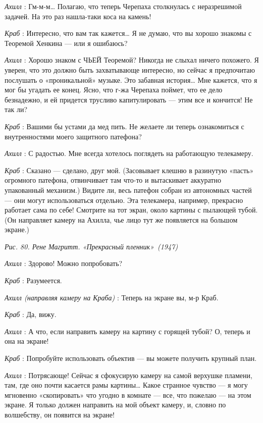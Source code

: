 \documentclass[../main.tex]{subfiles}
\begin{document}
\begin{dialogue}
\emph{Ахилл} : Гм-м-м\ldots{} Полагаю, что теперь Черепаха столкнулась с неразрешимой задачей. На это раз нашла-таки коса на камень!

\emph{Краб} : Интересно, что вам так кажется\ldots{} Я не думаю, что вы хорошо знакомы с Теоремой Хенкина --- или я ошибаюсь?

\emph{Ахилл} : Хорошо знаком с ЧЬЕЙ Теоремой? Никогда не слыхал ничего похожего. Я уверен, что это должно быть захватывающе интересно, но сейчас я предпочитаю послушать о «проникальной» музыке. Это забавная история\ldots{} Мне кажется, что я мог бы угадать ее конец. Ясно, что г-жа Черепаха поймет, что ее дело безнадежно, и ей придется трусливо капитулировать --- этим все и кончится! Не так ли?

\emph{Краб} : Вашими бы устами да мед пить. Не желаете ли теперь ознакомиться с внутренностями моего защитного патефона?

\emph{Ахилл} : С радостью. Мне всегда хотелось поглядеть на работающую телекамеру.

\emph{Краб} : Сказано --- сделано, друг мой. (Засовывает клешню в разинутую «пасть» огромного патефона, отвинчивает там что-то и вытаскивает аккуратно упакованный механизм.) Видите ли, весь патефон собран из автономных частей --- они могут использоваться отдельно. Эта телекамера, например, прекрасно работает сама по себе! Смотрите на тот экран, около картины с пылающей тубой. (Он направляет камеру на Ахилла, чье лицо тут же появляется на большом экране.)

\emph{Рис. 80. Рене Магритт. «Прекрасный пленник»~(1947)}

\emph{Ахилл} : Здорово! Можно попробовать?

\emph{Краб} : Разумеется.

\emph{Ахилл (направляя камеру на Краба)} : Теперь на экране вы, м-р Краб.

\emph{Краб} : Да, вижу.

\emph{Ахилл} : А что, если направить камеру на картину с горящей тубой? О, теперь и она на экране!

\emph{Краб} : Попробуйте использовать объектив --- вы можете получить крупный план.

\emph{Ахилл} : Потрясающе! Сейчас я сфокусирую камеру на самой верхушке пламени, там, где оно почти касается рамы картины\ldots{} Какое странное чувство --- я могу мгновенно «скопировать» что угодно в комнате --- все, что пожелаю --- на этом экране. Я только должен направить на мой объект камеру, и, словно по волшебству, он появится на экране!


\end{dialogue}
\end{document}
